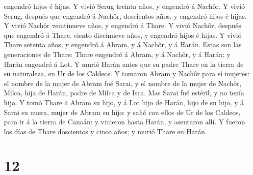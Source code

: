 engendró hijos é hijas.  Y vivió Serug treinta años, y
engendró á Nachôr.  Y vivió Serug, después que engendró á
Nachôr, doscientos años, y engendró hijos é hijas.  Y
vivió Nachôr veintinueve años, y engendró á Thare.  Y
vivió Nachôr, después que engendró á Thare, ciento diecinueve años, y
engendró hijos é hijas.  Y vivió Thare setenta años, y
engendró á Abram, y á Nachôr, y á Harán.  Estas son las
generaciones de Thare: Thare engendró á Abram, y á Nachôr, y á Harán; y
Harán engendró á Lot.  Y murió Harán antes que su padre
Thare en la tierra de su naturaleza, en Ur de los Caldeos.
 Y tomaron Abram y Nachôr para sí mujeres: el nombre de
la mujer de Abram fué Sarai, y el nombre de la mujer de Nachôr, Milca,
hija de Harán, padre de Milca y de Isca.  Mas Sarai fué
estéril, y no tenía hijo.  Y tomó Thare á Abram su hijo,
y á Lot hijo de Harán, hijo de su hijo, y á Sarai su nuera, mujer de
Abram su hijo: y salió con ellos de Ur de los Caldeos, para ir á la
tierra de Canaán: y vinieron hasta Harán, y asentaron allí.
 Y fueron los días de Thare doscientos y cinco años; y
murió Thare en Harán.

\hypertarget{section-11}{%
\section{12}\label{section-11}}

